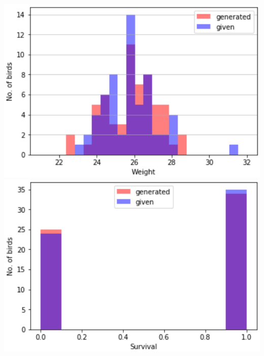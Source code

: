 \documentclass[12pt,a4paper]{article}
\begin{document}
\includegraphics[scale=0.31]{gen_weight_graph1}
\includegraphics[scale=0.31]{gen_survival_graph1}
\par \bigskip
\end{document}
